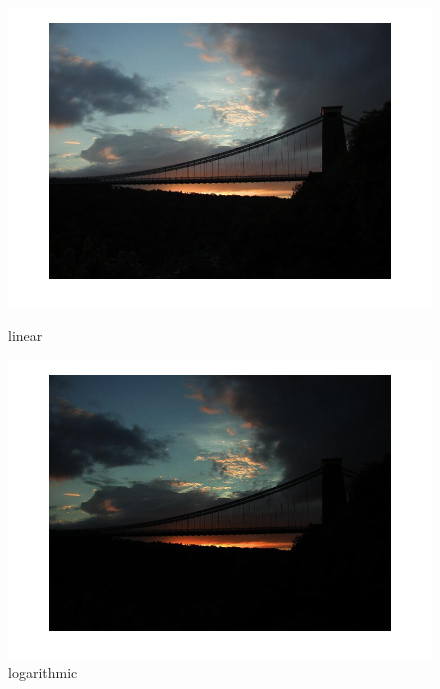         
      \begin{figure}[!htb]
      	\includegraphics[width=\linewidth]{images/linearhdr3}
      	\caption{linear}\label{fig:logtonemap}
      	\endminipage\hfill
      	\includegraphics[width=\linewidth]{images/loghdr3}
      	\caption{logarithmic}\label{fig:lineartonemap}
      	\endminipage\hfill
      \end{figure}
      
